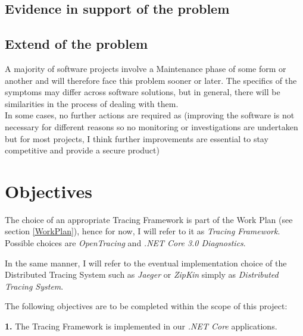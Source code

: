 \documentclass[11pt]{article}
\begin{document}
\subsection{Evidence in support of the problem}


\subsection{Extend of the problem}

A majority of software projects involve a Maintenance phase of some form or another and will therefore face this problem sooner or later. The specifics of the symptoms may differ across software solutions, but in general, there will be similarities in the process of dealing with them.\\
In some cases, no further actions are required as (improving the software is not necessary for different reasons so no monitoring or investigations are undertaken but for most projects, I think further improvements are essential to stay competitive and provide a secure product)

\section{Objectives} 


The choice of an appropriate Tracing Framework is part of the Work Plan (see section \ref{WorkPlan}), hence for now, I will refer to it as \textit{Tracing Framework}. Possible choices are \textit{OpenTracing} and \textit{.NET Core 3.0 Diagnostics}.

In the same manner, I will refer to the eventual implementation choice of the Distributed Tracing System such as \textit{Jaeger} or \textit{ZipKin} simply as \textit{Distributed Tracing System}.

The following objectives are to be completed within the scope of this project:

\textbf{1.} The Tracing Framework is implemented in our \textit{.NET Core} applications.

\end{document}

